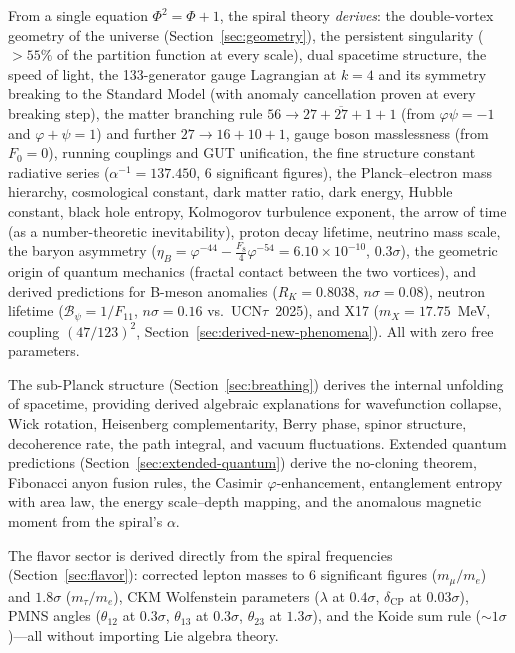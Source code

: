 \documentclass[12pt,a4paper]{article}
\begin{document}
From a single equation $\Phi^2 = \Phi + 1$, the spiral theory \emph{derives}: the double-vortex geometry of the universe (Section~\ref{sec:geometry}), the persistent singularity ($>55\%$ of the partition function at every scale), dual spacetime structure, the speed of light, the 133-generator gauge Lagrangian at $k = 4$ and its symmetry breaking to the Standard Model (with anomaly cancellation proven at every breaking step), the matter branching rule $56 \to 27 + \overline{27} + 1 + 1$ (from $\varphi\psi = -1$ and $\varphi + \psi = 1$) and further $27 \to 16 + 10 + 1$, gauge boson masslessness (from $F_0 = 0$), running couplings and GUT unification, the fine structure constant radiative series ($\alpha^{-1} = 137.450$, 6 significant figures), the Planck--electron mass hierarchy, cosmological constant, dark matter ratio, dark energy, Hubble constant, black hole entropy, Kolmogorov turbulence exponent, the arrow of time (as a number-theoretic inevitability), proton decay lifetime, neutrino mass scale, the baryon asymmetry ($\eta_B = \varphi^{-44} - \tfrac{F_8}{4}\varphi^{-54} = 6.10 \times 10^{-10}$, $0.3\sigma$), the geometric origin of quantum mechanics (fractal contact between the two vortices), and derived predictions for B-meson anomalies ($R_K = 0.8038$, $n\sigma = 0.08$), neutron lifetime ($\mathcal{B}_\psi = 1/F_{11}$, $n\sigma = 0.16$ vs.\ UCN$\tau$~2025), and X17 ($m_X = 17.75$~MeV, coupling $(47/123)^2$, Section~\ref{sec:derived-new-phenomena}). All with zero free parameters.

The sub-Planck structure (Section~\ref{sec:breathing}) derives the internal unfolding of spacetime, providing derived algebraic explanations for wavefunction collapse, Wick rotation, Heisenberg complementarity, Berry phase, spinor structure, decoherence rate, the path integral, and vacuum fluctuations.  Extended quantum predictions (Section~\ref{sec:extended-quantum}) derive the no-cloning theorem, Fibonacci anyon fusion rules, the Casimir $\varphi$-enhancement, entanglement entropy with area law, the energy scale--depth mapping, and the anomalous magnetic moment from the spiral's $\alpha$.

The flavor sector is derived directly from the spiral frequencies (Section~\ref{sec:flavor}): corrected lepton masses to 6 significant figures ($m_\mu/m_e$) and $1.8\sigma$ ($m_\tau/m_e$), CKM Wolfenstein parameters ($\lambda$ at $0.4\sigma$, $\delta_{\mathrm{CP}}$ at $0.03\sigma$), PMNS angles ($\theta_{12}$ at $0.3\sigma$, $\theta_{13}$ at $0.3\sigma$, $\theta_{23}$ at $1.3\sigma$), and the Koide sum rule (${\sim}1\sigma$)---all without importing Lie algebra theory.
\end{document}
